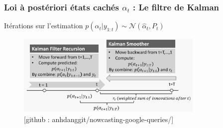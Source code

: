 \documentclass{presentation_template}
\begin{document}
    




\begin{frame}
    \frametitle{Loi à postériori états cachés $\alpha_t$ : Le filtre de Kalman }
    \centering
    Itérations sur l'estimation $p(\alpha_{t} | y_{1: t}) \sim \mathcal{N}(\hat{\alpha}_{t}, P_t)$
    \begin{figure}
        \includegraphics[width=0.8\textwidth]{Figures/kalman_filter.png}
        \caption{[github : anhdanggit/nowcasting-google-queries/]}
    \end{figure}
    
    
\end{frame}
\end{document}
